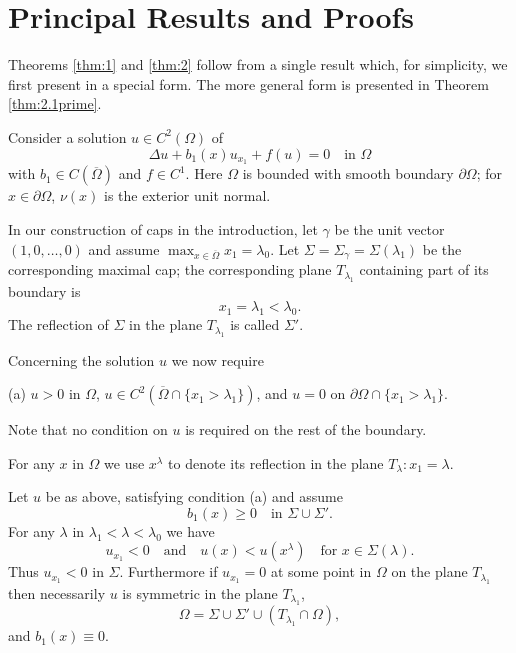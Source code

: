 \section{Principal Results and Proofs}\label{sec:2}

\setcounter{theorem}{0}

 Theorems \ref{thm:1} and \ref{thm:2} follow from a single result which,
for simplicity, we first present in a special form. The more general form is presented in
Theorem \ref{thm:2.1prime}.

Consider a solution $u\in C^2(\Omega)$ of
\begin{equation}\label{eq:2.1}
  \Delta u + b_1(x)u_{x_1} + f(u) = 0 \quad \text{in } \Omega
\end{equation}
with $b_1\in C(\overline{\Omega})$ and $f\in C^1$.
Here $\Omega$ is bounded with smooth boundary $\partial\Omega$;
for $x\in\partial\Omega$, $\nu(x)$ is the exterior unit normal.

In our construction of caps in the introduction, let $\gamma$ be the unit vector
$(1,0,\ldots,0)$ and assume $\max_{x\in\overline{\Omega}} x_1 = \lambda_0$.
Let $\Sigma = \Sigma_\gamma = \Sigma(\lambda_1)$ be the corresponding maximal cap;
the corresponding plane $T_{\lambda_1}$ containing part of its boundary is
\[x_1 = \lambda_1 < \lambda_0.\]
The reflection of $\Sigma$ in the plane $T_{\lambda_1}$ is called $\Sigma'$.

Concerning the solution $u$ we now require

(a) $u>0$ in $\Omega$, $u\in C^2(\overline{\Omega}\cap\{x_1>\lambda_1\})$,
and $u=0$ on $\partial\Omega\cap\{x_1>\lambda_1\}$.

Note that no condition on $u$ is required on the rest of the boundary.

For any $x$ in $\Omega$ we use $x^\lambda$ to denote its reflection in the plane
$T_\lambda : x_1=\lambda$.

\begin{theorem}\label{thm:2.1}
  Let $u$ be as above, satisfying condition (a) and assume
  \[b_1(x) \geq 0 \quad \text{in } \Sigma\cup\Sigma'.\]
  For any $\lambda$ in $\lambda_1 < \lambda < \lambda_0$ we have
  \begin{equation}\label{eq:2.2}
    u_{x_1} < 0\quad \text{and} \quad u(x) < u(x^\lambda) \quad \text{for } x\in \Sigma(\lambda).
  \end{equation}
  Thus $u_{x_1}<0$ in $\Sigma$. Furthermore if $u_{x_1} = 0$
  at some point in $\Omega$ on the plane $T_{\lambda_1}$
  then necessarily $u$ is symmetric in the plane $T_{\lambda_1}$,
  \begin{equation}\label{eq:2.3}
    \Omega = \Sigma\cup\Sigma'\cup(T_{\lambda_1}\cap\Omega),
  \end{equation}
  and $b_1(x)\equiv 0$.
\end{theorem}

